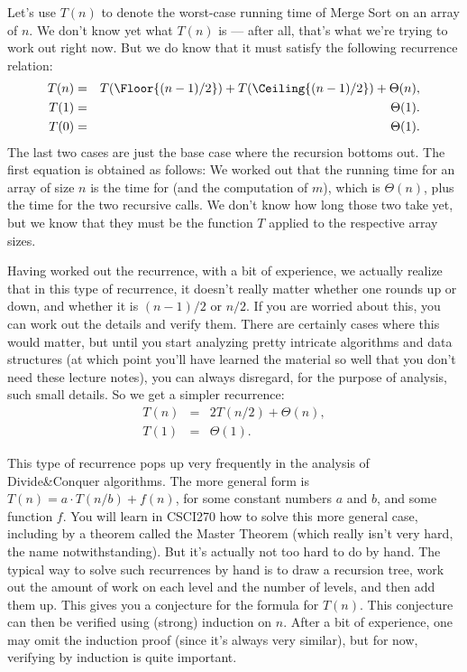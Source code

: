 Let's use $T(n)$ to denote the worst-case running time of Merge Sort
on an array of $n$. 
We don't know yet what $T(n)$ is --- after all, that's what
we're trying to work out right now. 
But we do know that it must satisfy the following recurrence relation:
\begin{eqnarray*}
T(n) & = & T(\Floor{(n-1)/2}) + T(\Ceiling{(n-1)/2}) + \Theta(n),\\
T(1) & = & \Theta(1).\\
T(0) & = & \Theta(1).
\end{eqnarray*}
The last two cases are just the base case where the recursion bottoms
out. The first equation is obtained as follows: We worked out that the
running time for an array of size $n$ is the time for 
(and the computation of $m$), which is $\Theta(n)$, plus the time for
the two recursive calls. We don't know how long those two take yet,
but we know that they must be the function $T$ applied to the
respective array sizes. 

Having worked out the recurrence, with a bit of experience, we
actually realize that in this type of recurrence, it doesn't really
matter whether one rounds up or down, and whether it is $(n-1)/2$ or
$n/2$. If you are worried about this, you can work out the details and
verify them. There are certainly cases where this would matter, but
until you start analyzing pretty intricate algorithms and data
structures (at which point you'll have learned the material so well
that you don't need these lecture notes), you can always disregard, for
the purpose of analysis, such small details.
So we get a simpler recurrence:
\begin{eqnarray*}
T(n) & = & 2T(n/2) + \Theta(n),\\
T(1) & = & \Theta(1).
\end{eqnarray*}

This type of recurrence pops up very frequently in the analysis of
Divide\&{}Conquer algorithms. The more general form is
$T(n) = a \cdot T(n/b) + f(n)$, for some constant numbers $a$ and $b$,
and some function $f$. You will learn in CSCI270 how to solve this
more general case, including by a theorem called the Master Theorem
(which really isn't very hard, the name notwithstanding).
But it's actually not too hard to do by hand. 
The typical way to solve such recurrences by hand is to draw a
recursion tree, work out the amount of work on each level and the
number of levels, and then add them up. This gives you a conjecture
for the formula for $T(n)$. 
This conjecture can then be verified using (strong) induction on $n$. 
After a bit of experience, one may omit the induction proof (since
it's always very similar), but for now, verifying by induction is
quite important.

